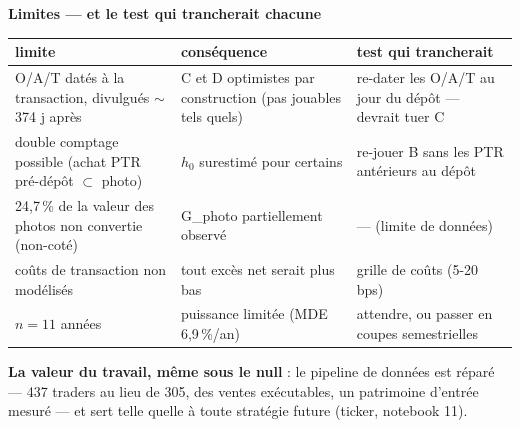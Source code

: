 \documentclass[10pt,a4paper,landscape]{article}
\begin{document}
\begin{minipage}[t]{0.50\textwidth}\vspace{0pt}
\textbf{Limites --- et le test qui trancherait chacune}
\begin{center}\small
\begin{tabularx}{\linewidth}{@{}XXX@{}}
\toprule
limite & conséquence & test qui trancherait \\
\midrule
O/A/T datés à la transaction, divulgués $\sim$374 j après & C et D optimistes par construction (pas jouables tels quels) & re-dater les O/A/T au jour du dépôt --- devrait tuer C \\
double comptage possible (achat PTR pré-dépôt $\subset$ photo) & $h_0$ surestimé pour certains & re-jouer B sans les PTR antérieurs au dépôt \\
24,7\,\% de la valeur des photos non convertie (non-coté) & G\_photo partiellement observé & --- (limite de données) \\
coûts de transaction non modélisés & tout excès net serait plus bas & grille de coûts (5-20 bps) \\
$n = 11$ années & puissance limitée (MDE 6,9\,\%/an) & attendre, ou passer en coupes semestrielles \\
\bottomrule
\end{tabularx}
\end{center}

\vspace{1mm}
\textbf{La valeur du travail, même sous le null} : le pipeline de données est réparé --- 437 traders au lieu de 305, des ventes exécutables, un patrimoine d'entrée mesuré --- et sert telle quelle à toute stratégie future (ticker, notebook 11).
\end{minipage}
\end{document}
